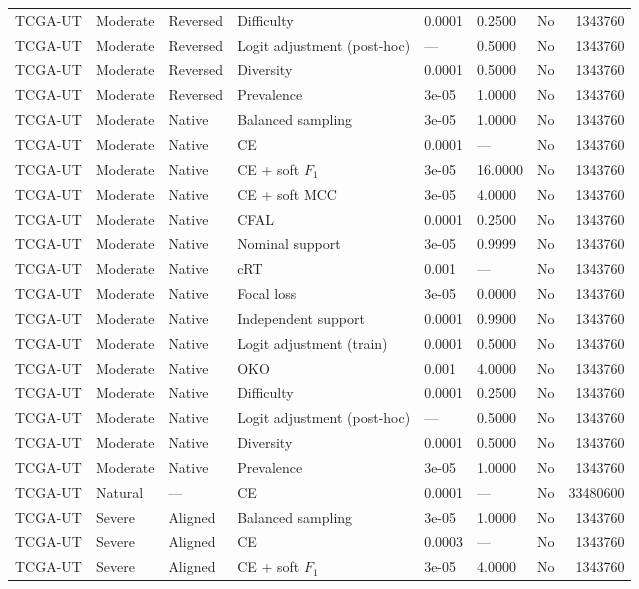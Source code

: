 \begin{longtable}{lllllllr}
TCGA-UT & Moderate & Reversed & Difficulty & 0.0001 & 0.2500 & No & 1343760 \\
TCGA-UT & Moderate & Reversed & Logit adjustment (post-hoc) & --- & 0.5000 & No & 1343760 \\
TCGA-UT & Moderate & Reversed & Diversity & 0.0001 & 0.5000 & No & 1343760 \\
TCGA-UT & Moderate & Reversed & Prevalence & 3e-05 & 1.0000 & No & 1343760 \\
TCGA-UT & Moderate & Native & Balanced sampling & 3e-05 & 1.0000 & No & 1343760 \\
TCGA-UT & Moderate & Native & CE & 0.0001 & --- & No & 1343760 \\
TCGA-UT & Moderate & Native & CE + soft $F_1$ & 3e-05 & 16.0000 & No & 1343760 \\
TCGA-UT & Moderate & Native & CE + soft MCC & 3e-05 & 4.0000 & No & 1343760 \\
TCGA-UT & Moderate & Native & CFAL & 0.0001 & 0.2500 & No & 1343760 \\
TCGA-UT & Moderate & Native & Nominal support & 3e-05 & 0.9999 & No & 1343760 \\
TCGA-UT & Moderate & Native & cRT & 0.001 & --- & No & 1343760 \\
TCGA-UT & Moderate & Native & Focal loss & 3e-05 & 0.0000 & No & 1343760 \\
TCGA-UT & Moderate & Native & Independent support & 0.0001 & 0.9900 & No & 1343760 \\
TCGA-UT & Moderate & Native & Logit adjustment (train) & 0.0001 & 0.5000 & No & 1343760 \\
TCGA-UT & Moderate & Native & OKO & 0.001 & 4.0000 & No & 1343760 \\
TCGA-UT & Moderate & Native & Difficulty & 0.0001 & 0.2500 & No & 1343760 \\
TCGA-UT & Moderate & Native & Logit adjustment (post-hoc) & --- & 0.5000 & No & 1343760 \\
TCGA-UT & Moderate & Native & Diversity & 0.0001 & 0.5000 & No & 1343760 \\
TCGA-UT & Moderate & Native & Prevalence & 3e-05 & 1.0000 & No & 1343760 \\
TCGA-UT & Natural & --- & CE & 0.0001 & --- & No & 33480600 \\
TCGA-UT & Severe & Aligned & Balanced sampling & 3e-05 & 1.0000 & No & 1343760 \\
TCGA-UT & Severe & Aligned & CE & 0.0003 & --- & No & 1343760 \\
TCGA-UT & Severe & Aligned & CE + soft $F_1$ & 3e-05 & 4.0000 & No & 1343760 \\

\end{longtable}
